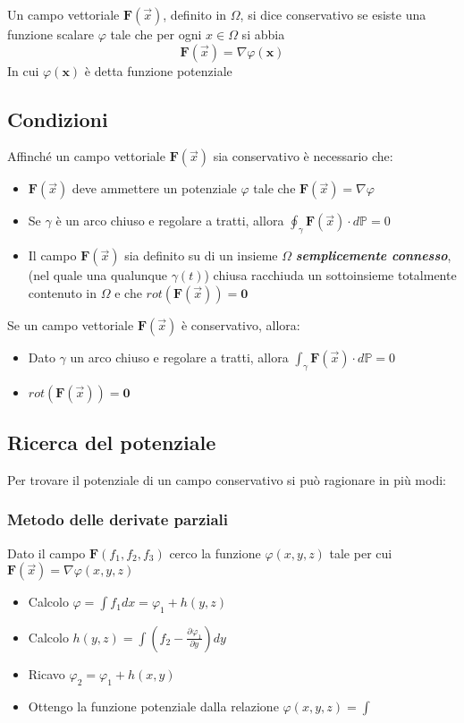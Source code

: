 \documentclass[10pt,a4paper]{report}
\newcommand{\pdv}[3]{\frac{\partial^{#2} #1}{\partial #3^{#2}}}
\begin{document}
			Un campo vettoriale $ \mathbf{F}(\vec{x}) $, definito in $ \Omega $, si dice conservativo se 
			esiste una funzione scalare $ \varphi $ tale che per ogni $ x \in \Omega $ si abbia \[ \mathbf{F}(\vec{x}) = \nabla \varphi(\mathbf{x})\] In cui $ \varphi(\mathbf{x}) $ è detta funzione potenziale
			
			\subsection*{Condizioni}
			Affinché un campo vettoriale $ \mathbf{F}(\vec{x}) $ sia conservativo è necessario che:
			\begin{itemize}
                \item $ \mathbf{F}(\vec{x}) $ deve ammettere un potenziale $ \varphi $ tale che $ \mathbf{F}(\vec{x})= \nabla \varphi$
				\item Se $ \gamma $ è un arco chiuso e regolare a tratti, allora $ \oint_{\gamma } \mathbf{F}(\vec{x}) \cdot d\mathbb{P}  =  0$
				\item Il campo $ \mathbf{F}(\vec{x}) $ sia definito su di un insieme $ \Omega $ \textit{\textbf{semplicemente connesso}}, (nel quale una qualunque $ \gamma(t) $) chiusa racchiuda un sottoinsieme totalmente contenuto in $ \Omega $ e che $ rot(\mathbf{F}(\vec{x})) = \textbf{0} $ \\ 
			\end{itemize}
			Se un campo vettoriale $ \mathbf{F}(\vec{x}) $ è conservativo, allora:
			\begin{itemize}
				\item Dato $ \gamma $ un arco chiuso e regolare a tratti, allora $ \int_{\gamma } \mathbf{F}(\vec{x}) \cdot d\mathbb{P}  =  0$
				\item $ rot(\mathbf{F}(\vec{x})) = \textbf{0} $
			\end{itemize}
		
			\subsection*{Ricerca del potenziale}
			Per trovare il potenziale di un campo conservativo si può ragionare in più modi:

                \subsubsection{Metodo delle derivate parziali}
                    Dato il campo $ \mathbf{F}(f_{1},f_{2},f_{3}) $ cerco la funzione $ \varphi(x,y,z) $ tale per cui $ \mathbf{F}(\vec{x}) = \nabla \varphi(x,y,z) $
                \begin{itemize}
                    \item Calcolo $ \varphi = \int f_{1} dx = \varphi_{1} + h(y,z)$
                    \item Calcolo $ h(y,z) = \int (f_{2} - \pdv{\varphi_{1}}{}{y})dy$
                    \item Ricavo $ \varphi_{2} = \varphi_{1} + h(x,y) $
                    \item Ottengo la funzione potenziale  dalla relazione $\varphi(x,y,z) = \int  $  
                \end{itemize} 
				
\end{document}
